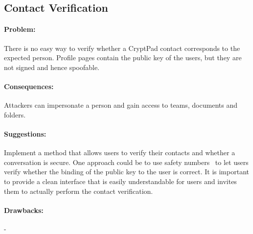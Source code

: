 \subsection{Contact Verification}

\paragraph{Problem:}
There is no easy way to verify whether a CryptPad contact corresponds to the expected person.
Profile pages contain the public key of the users, but they are not signed and hence spoofable.

\paragraph{Consequences:}
Attackers can impersonate a person and gain access to teams, documents and folders.

\paragraph{Suggestions:}
Implement a method that allows users to verify their contacts and whether a conversation is secure.
One approach could be to use safety numbers~\cite{Marlinspike2016} to let users verify whether the binding of the public key to the user is correct.
It is important to provide a clean interface that is easily understandable for users and invites them to actually perform the contact verification.

\paragraph{Drawbacks:} -
